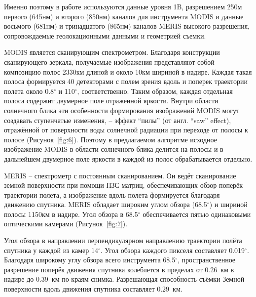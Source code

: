 Именно поэтому в работе используются данные уровня 1B, разрешением 250м первого (645нм) и второго (850нм) каналов для инструмента MODIS и данные восьмого (681нм) и тринадцатого (865нм) каналов MERIS высокого разрешения, сопровождаемые геолокационными данными и геометрией съемки.

MODIS является сканирующим спектрометром. Благодаря конструкции сканирующего зеркала, получаемые изображения представляют собой композицию полос 2330км длиной и около 10км шириной в надире. Каждая такая полоса формируется 40 детекторами с полем зрения вдоль и поперек траектории полета около 0.8${}^\circ$ и 110${}^\circ$, соответственно. Таким образом, каждая отдельная полоса содержит двумерное поле отраженной яркости. Внутри области солнечного блика эти особенности формирования изображений MODIS могут создавать ступенчатые изменения, -- эффект ``пилы'' (от англ. ``saw'' effect), отражённой от поверхности воды солнечной радиации при переходе от полосы к полосе (Рисунок~\ref{fig:6}). Поэтому в предлагаемом алгоритме исходное изображение MODIS в области солнечного блика делится на полосы и в дальнейшем двумерное поле яркости в каждой из полос обрабатывается отдельно.

MERIS -- спектрометр с постоянным сканированием. Он ведёт сканирование земной поверхности при помощи ПЗС матриц, обеспечивающих обзор поперёк траектории полета, а изображение вдоль полета формируется благодаря движению спутника. MERIS обладает широким углом обзора (68.5${}^\circ$) и шириной полосы 1150км в надире. Угол обзора в 68.5${}^\circ$ обеспечивается пятью одинаковыми оптическими камерами (Рисунок~\ref{fig:7}).

Угол обзора в направлении перпендикулярном направлению траектории полёта спутника у каждой из камер 14${}^\circ$. Угол обзора каждого пикселя составляет 0.019${}^\circ$. Благодаря широкому углу обзора всего инструмента 68.5${}^\circ$, пространственное разрешение поперёк движения спутника колеблется в пределах от 0.26~км в надире до 0.39~км по краям снимка. Разрешающая способность съёмки Земной поверхности вдоль движения спутника составляет 0.29~км.


